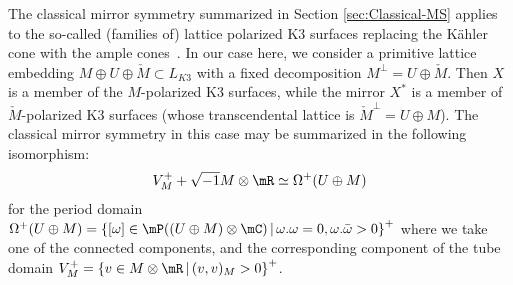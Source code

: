 \documentclass[pdftex]{sigma}
\numberwithin{equation}{section}
\begin{document}
The classical mirror symmetry summarized in Section \ref{sec:Classical-MS} applies to the so-called (families of) lattice polarized K3 surfaces replacing the K\"ahler cone with the ample cones~\cite{Do}. In our case here, we consider a primitive lattice embedding $M\oplus U\oplus\check{M}\subset L_{K3}$ with a fixed decomposition $M^{\perp}=U\oplus\check{M}$. Then $X$ is a member of the $M$-polarized K3 surfaces, while the mirror $X^{*}$ is a member of $\check{M}$-polarized K3 surfaces (whose transcendental lattice is $\check{M}^{\perp}=U\oplus M$). The classical mirror symmetry in this case may be summarized in the following isomorphism:
\begin{gather*}
V_{M}^{+}+\sqrt{-1}M\otimes\mR\simeq\Omega^{+}(U\oplus M)
\end{gather*}
for the period domain $\Omega^{+}(U\oplus M)=\left\{ [\omega]\in\mP((U\oplus M)\otimes\mC)\,|\,\omega.\omega=0,\omega.\bar{\omega}>0\right\} ^{+}$ where we take one of the connected components, and the corresponding component of the tube domain $V_{M}^{+}=\left\{ v\in M\otimes\mR\,|\,(v,v)_{M}>0\right\} ^{+}$.
\end{document}
